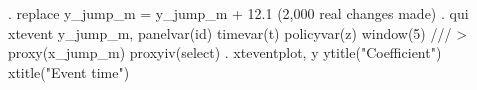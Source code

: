 . replace y_jump_m = y_jump_m + 12.1 
(2,000 real changes made)
{\smallskip}
. qui xtevent y_jump_m, panelvar(id) timevar(t) policyvar(z) window(5) ///
>         proxy(x_jump_m) proxyiv(select)
{\smallskip}
. xteventplot, y  ytitle("Coefficient") xtitle("Event time")
